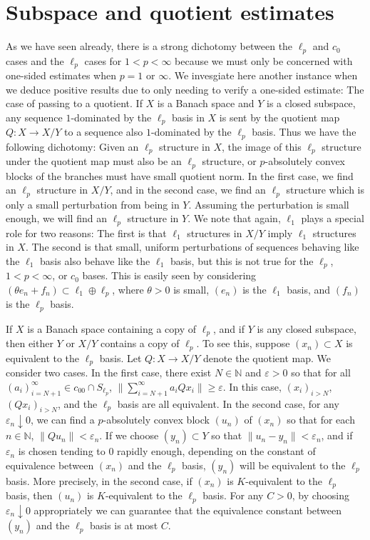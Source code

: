 \documentclass[12pt]{amsart}
\theoremstyle{definition}
\newcommand{\nn}{\mathbb{N}}
\begin{document}
\section{Subspace and quotient estimates}

As we have seen already, there is a strong dichotomy between the $\ell_p$ and $c_0$ cases and the $\ell_p$ cases for $1<p<\infty$ because we must only be concerned with one-sided estimates when $p=1$ or $\infty$.  We invesgiate here another instance when we deduce positive results due to only needing to verify a one-sided estimate: The case of passing to a quotient.  If $X$ is a Banach space and $Y$ is a closed subspace, any sequence $1$-dominated by the $\ell_p$ basis in $X$ is sent by the quotient map $Q:X\to X/Y$ to a sequence also $1$-dominated by the $\ell_p$ basis.  Thus we have the following dichotomy: Given an $\ell_p$ structure in $X$, the image of this $\ell_p$ structure under the quotient map must also be an $\ell_p$ structure, or $p$-absolutely convex blocks of the branches must have small quotient norm.  In the first case, we find an $\ell_p$ structure in $X/Y$, and in the second case, we find an $\ell_p$ structure which is only a small perturbation from being in $Y$.  Assuming the perturbation is small enough, we will find an $\ell_p$ structure in $Y$.  We note that again, $\ell_1$ plays a special role for two reasons: The first is that $\ell_1$ structures in $X/Y$ imply $\ell_1$ structures in $X$.  The second is that small, uniform perturbations of sequences behaving like the $\ell_1$ basis also behave like the $\ell_1$ basis, but this is not true for the $\ell_p$, $1<p<\infty$, or $c_0$ bases.  This is easily seen by considering $(\theta e_n+f_n)\subset \ell_1\oplus \ell_p$, where $\theta>0$ is small, $(e_n)$ is the $\ell_1$ basis, and $(f_n)$ is the $\ell_p$ basis.  

If $X$ is a Banach space containing a copy of $\ell_p$, and if $Y$ is any closed subspace, then either $Y$ or $X/Y$ contains a copy of $\ell_p$.  To see this, suppose $(x_n)\subset X$ is equivalent to the $\ell_p$ basis.  Let $Q:X\to X/Y$ denote the quotient map.  We consider two cases.  In the first case, there exist $N\in \nn$ and  $\varepsilon>0$ so that for all $(a_i)_{i=N+1}^\infty \in c_{00}\cap S_{\ell_p}$, $\|\sum_{i=N+1}^\infty a_iQx_i\|\geqslant \varepsilon$.  In this case, $(x_i)_{i>N}$, $(Qx_i)_{i>N}$, and the $\ell_p$ basis are all equivalent.  In the second case, for any $\varepsilon_n\downarrow 0$, we can find a $p$-absolutely convex block $(u_n)$ of $(x_n)$ so that for each $n\in \nn$, $\|Qu_n\|<\varepsilon_n$.  If we choose $(y_n)\subset Y$ so that $\|u_n-y_n\|<\varepsilon_n$, and if $\varepsilon_n$ is chosen tending to $0$ rapidly enough, depending on the constant of equivalence between $(x_n)$ and the $\ell_p$ basis, $(y_n)$ will be equivalent to the $\ell_p$ basis.  More precisely, in the second case, if $(x_n)$ is $K$-equivalent to the $\ell_p$ basis, then $(u_n)$ is $K$-equivalent to the $\ell_p$ basis. For any $C>0$, by choosing $\varepsilon_n\downarrow 0$ appropriately we can guarantee that the equivalence constant between $(y_n)$ and the $\ell_p$ basis is at most $C$.   
\end{document}
